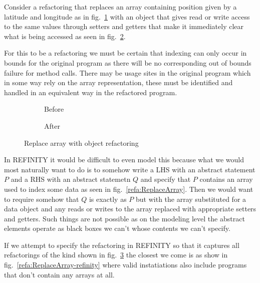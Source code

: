 Consider a refactoring that replaces an array containing position given by a latitude and longitude as in fig.~\ref{refa:ReplaceArray-java-before} with an object that gives read or write access to the same values through setters and getters that make it immediately clear what is being accessed as seen in fig.~\ref{refa:ReplaceArray-java-after}.

For this to be a refactoring we must be certain that indexing can only occur in bounds for the original program as there will be no corresponding out of bounds failure for method calls. There may be usage sites in the original program which in some way rely on the array representation, these must be identified and handled in an equivalent way in the refactored program.

\begin{figure}
  \begin{subfigure}[h]{.45\linewidth} 
    
    \caption{Before}
    \label{refa:ReplaceArray-java-before}   
  \end{subfigure}\hspace{1cm}
  \begin{subfigure}[h]{.45\linewidth}
    
    \caption{After}
    \label{refa:ReplaceArray-java-after}
  \end{subfigure}
  \caption{Replace array with object refactoring}
  \label{refa:ReplaceArray-java}
\end{figure}

In REFINITY it would be difficult to even model this because what we would most naturally want to do is to somehow write a LHS with an abstract statement $P$ and a RHS with an abstract statemetn $Q$ and specify that $P$ contains an array used to index some data as seen in fig.~\ref{refa:ReplaceArray}. Then we would want to require somehow that $Q$ is exactly as $P$ but with the array substituted for a data object and any reads or writes to the array replaced with appropriate setters and getters. Such things are not possible as on the modeling level the abstract elements operate as black boxes we can't whose contents we can't specify.

If we attempt to specify the refactoring in REFINITY so that it captures all refactorings of the kind shown in fig.~\ref{refa:ReplaceArray-java} the closest we come is as show in fig.~\ref{refa:ReplaceArray-refinity} where valid instatiations
also include programs that don't contain any arrays at all.

